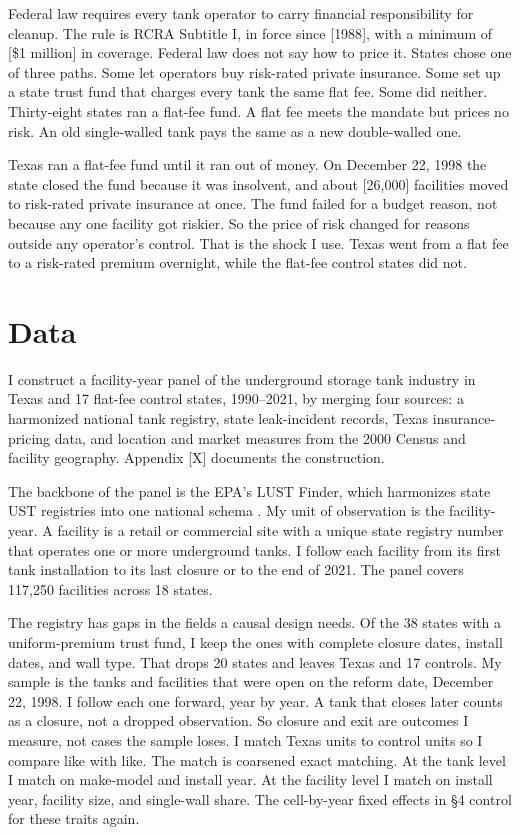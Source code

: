 \documentclass[
  12pt,
]{article}
\begin{document}
Federal law requires every tank operator to carry financial
responsibility for cleanup. The rule is RCRA Subtitle I, in force since
{[}1988{]}, with a minimum of {[}\$1 million{]} in coverage. Federal law
does not say how to price it. States chose one of three paths. Some let
operators buy risk-rated private insurance. Some set up a state trust
fund that charges every tank the same flat fee. Some did neither.
Thirty-eight states ran a flat-fee fund. A flat fee meets the mandate
but prices no risk. An old single-walled tank pays the same as a new
double-walled one.

Texas ran a flat-fee fund until it ran out of money. On December 22,
1998 the state closed the fund because it was insolvent, and about
{[}26,000{]} facilities moved to risk-rated private insurance at once.
The fund failed for a budget reason, not because any one facility got
riskier. So the price of risk changed for reasons outside any operator's
control. That is the shock I use. Texas went from a flat fee to a
risk-rated premium overnight, while the flat-fee control states did not.

\section{Data}\label{data}

I construct a facility-year panel of the underground storage tank
industry in Texas and 17 flat-fee control states, 1990--2021, by merging
four sources: a harmonized national tank registry, state leak-incident
records, Texas insurance-pricing data, and location and market measures
from the 2000 Census and facility geography. Appendix {[}X{]} documents
the construction.

The backbone of the panel is the EPA's LUST Finder, which harmonizes
state UST registries into one national schema
\citep{EPA2017USTCompendium}. My unit of observation is the
facility-year. A facility is a retail or commercial site with a unique
state registry number that operates one or more underground tanks. I
follow each facility from its first tank installation to its last
closure or to the end of 2021. The panel covers 117,250 facilities
across 18 states.

The registry has gaps in the fields a causal design needs. Of the 38
states with a uniform-premium trust fund, I keep the ones with complete
closure dates, install dates, and wall type. That drops 20 states and
leaves Texas and 17 controls. My sample is the tanks and facilities that
were open on the reform date, December 22, 1998. I follow each one
forward, year by year. A tank that closes later counts as a closure, not
a dropped observation. So closure and exit are outcomes I measure, not
cases the sample loses. I match Texas units to control units so I
compare like with like. The match is coarsened exact matching. At the
tank level I match on make-model and install year. At the facility level
I match on install year, facility size, and single-wall share. The
cell-by-year fixed effects in §4 control for these traits again.
\end{document}
